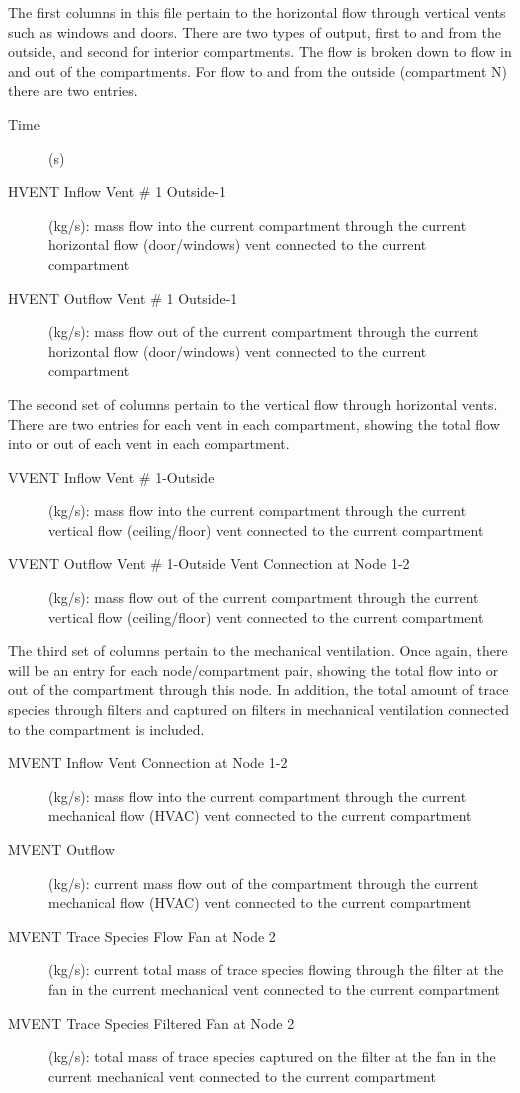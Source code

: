 The first columns in this file pertain to the horizontal flow through vertical vents such as windows and doors. There are two types of output, first to and from the outside, and second for interior compartments. The flow is broken down to flow in and out of the compartments. For flow to and from the outside (compartment N) there are two entries.
\begin{description}
\item[Time] (s)
\item[HVENT Inflow Vent \# 1 Outside-1] (kg/s): mass flow into the current compartment through the current horizontal flow (door/windows) vent connected to the current compartment
\item[HVENT Outflow Vent \# 1 Outside-1] (kg/s): mass flow out of the current compartment through the current horizontal flow (door/windows) vent connected to the current compartment
\end{description}
The second set of columns pertain to the vertical flow through horizontal vents. There are two entries for each vent in each compartment, showing the total flow into or out of each vent in each compartment.
\begin{description}
\item[VVENT Inflow Vent \# 1-Outside] (kg/s):  mass flow into the current compartment through the current vertical flow (ceiling/floor) vent connected to the current compartment
\item[VVENT Outflow Vent \# 1-Outside Vent Connection at Node 1-2] (kg/s):  mass flow out of the current  compartment through the current vertical flow (ceiling/floor) vent connected to the current compartment
\end{description}
The third set of columns pertain to the mechanical ventilation. Once again, there will be an entry for each node/compartment pair, showing the total flow into or out of the compartment through this node. In addition, the total amount of trace species through filters and captured on filters in mechanical ventilation connected to the compartment is included.
\begin{description}
\item[MVENT Inflow Vent Connection at Node 1-2] (kg/s): mass flow into the current compartment through the current mechanical flow (HVAC) vent connected to the current compartment
\item[MVENT Outflow] (kg/s): current mass flow out of the compartment through the current mechanical flow (HVAC) vent connected to the current compartment
\item[MVENT Trace Species Flow Fan at Node 2] (kg/s): current total mass of trace species flowing through the filter at the fan in the current mechanical vent connected to the current compartment
\item[MVENT Trace Species Filtered Fan at Node 2] (kg/s): total mass of trace species captured on the filter at the fan in the current mechanical vent connected to the current compartment
\end{description}

